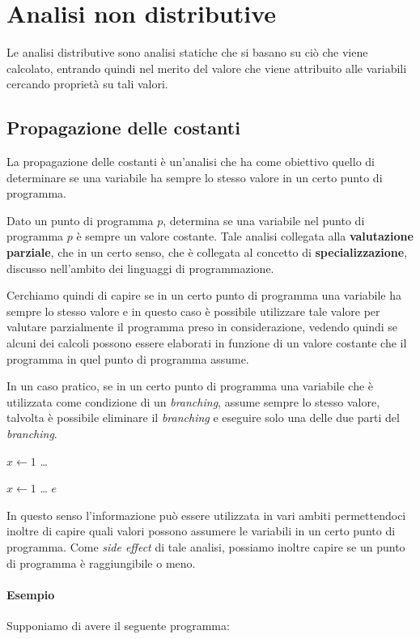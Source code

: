 \chapter{Analisi non distributive}
Le analisi distributive sono analisi statiche che si basano su ciò che viene 
calcolato, entrando quindi nel merito del valore che viene attribuito alle variabili 
cercando proprietà su tali valori.
\section{Propagazione delle costanti}
La propagazione delle costanti è un'analisi che ha come obiettivo quello di determinare 
se una variabile ha sempre lo stesso valore in un certo punto di programma.

Dato un punto di programma $p$, determina se una variabile nel punto di programma $p$ è sempre 
un valore costante. Tale analisi collegata alla \textbf{valutazione parziale}, che in un certo senso, 
che è collegata al concetto di \textbf{specializzazione}, discusso nell'ambito dei linguaggi 
di programmazione.

Cerchiamo quindi di capire se in un certo punto di programma una variabile ha sempre
lo stesso valore e in questo caso è possibile utilizzare tale valore per valutare parzialmente 
il programma preso in considerazione, vedendo quindi se alcuni dei calcoli possono essere
elaborati in funzione di un valore costante che il programma in quel punto di programma assume.

In un caso pratico, se in un certo
punto di programma una variabile che è utilizzata come condizione di un \textit{branching},
assume sempre lo stesso valore, talvolta è possibile eliminare il \textit{branching} e
eseguire solo una delle due parti del \textit{branching}.

\begin{algorithm}[H]
    $x \gets 1$\;
    \dots\;
\end{algorithm}
\begin{algorithm}[H]
    $x \gets 1$\;
    \dots\;
    $e$\;
\end{algorithm}

In questo senso l'informazione può essere utilizzata in vari ambiti permettendoci inoltre 
di capire quali valori possono assumere le variabili in un certo punto di programma.
Come \textit{side effect} di tale analisi, possiamo inoltre capire se un punto di 
programma è raggiungibile o meno.
\subsubsection{Esempio}
Supponiamo di avere il seguente programma:

